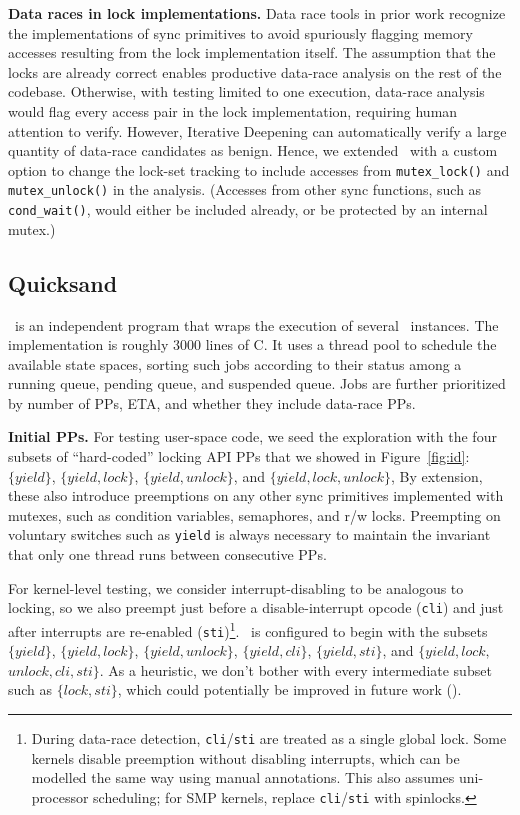 {\bf Data races in lock implementations.}
Data race tools in prior work \cite{tsan,portend} recognize the implementations of sync primitives to avoid spuriously flagging memory accesses resulting from the lock implementation itself.
The assumption that the locks are already correct enables productive data-race analysis on the rest of the codebase.
Otherwise, with testing limited to one execution,
data-race analysis would flag every access pair in the lock implementation, requiring human attention to verify.
However, Iterative Deepening can automatically verify a large quantity of data-race candidates as benign.
Hence, we extended \landslide~with a custom option to change the lock-set tracking to include accesses from {\tt mutex\_lock()} and {\tt mutex\_unlock()} in the analysis. (Accesses from other sync functions, such as {\tt cond\_wait()}, would either be included already, or be protected by an internal mutex.)

\subsection{Quicksand}

\quicksand~is an independent program that wraps the execution of several \landslide~instances.
The implementation is roughly 3000 lines of C.
It uses a thread pool to schedule the available state spaces,
sorting such jobs according to their status among a running queue, pending queue, and suspended queue.
Jobs are further prioritized by number of PPs, ETA, and whether they include data-race PPs.

{\bf Initial PPs.}
For testing user-space code, we seed the exploration with the four subsets of ``hard-coded'' locking API PPs that we showed in Figure~\ref{fig:id}:
$\{yield\}$,
$\{yield,lock\}$,
$\{yield,unlock\}$,
and $\{yield,lock,unlock\}$,
By extension, these also introduce preemptions on any other sync primitives implemented with mutexes,
such as condition variables, semaphores, and r/w locks.
Preempting on voluntary switches such as {\tt yield} is always necessary to maintain the invariant that only one thread runs between consecutive PPs.

For kernel-level testing, we consider interrupt-disabling to be analogous to locking,
so we also preempt just before a disable-interrupt opcode ({\tt cli}) and just after interrupts are re-enabled ({\tt sti})\footnote{
During data-race detection, {\tt cli}/{\tt sti} are treated as a single global lock.
Some kernels disable preemption without disabling interrupts,
which can be modelled the same way using manual annotations. %
This also assumes uni-processor scheduling; for SMP kernels, replace {\tt cli}/{\tt sti} with spinlocks.}.
\quicksand~is configured to begin with the subsets
$\{yield\}$,
$\{yield,lock\}$,
$\{yield,unlock\}$,
$\{yield,cli\}$,
$\{yield,sti\}$,
and $\{yield,lock,$ $unlock,cli,sti\}$.
As a heuristic, we don't bother with every intermediate subset such as $\{lock,sti\}$,
which could potentially be improved in future work (\sect{\ref{sec:future}}).

